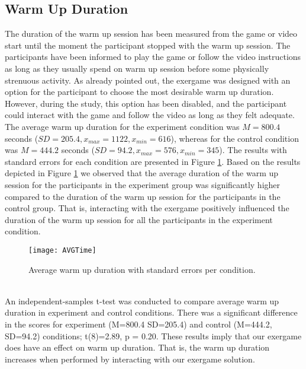 \subsection{Warm Up Duration}
The duration of the warm up session has been measured from the game or video start until the moment the participant stopped with the warm up session. The participants have been informed to play the game or follow the video instructions as long as they usually spend on warm up session before some physically strenuous activity. As already pointed out, the exergame was designed with an option for the participant to choose the most desirable warm up duration. However, during the study, this option has been disabled, and the participant could interact with the game and follow the video as long as they felt adequate. The average warm up duration for the experiment condition was \begin{math}M = 800.4 \end{math} seconds (\begin{math} SD = 205.4, x_{max}=1122, x_{min}=616 \end{math}), whereas for the control condition was \begin{math}M = 444.2 \end{math} seconds (\begin{math} SD = 94.2, x_{max}= 576, x_{min}= 345\end{math}). The  results with standard errors for each condition are presented in Figure \ref{fig:wuduration}. Based on the results depicted in Figure \ref{fig:wuduration} we observed that the average duration of the warm up session for the participants in the experiment group was significantly higher compared to the duration of the warm up session for the participants in the control group. That is, interacting with the exergame positively influenced the duration of the warm up session for all the participants in the experiment condition.
\begin{figure}[h]
    \centering
    \texttt{[image: AVGTime]}
    \caption{Average warm up duration with standard errors per condition.}
    \label{fig:wuduration}
\end{figure}\\
An independent-samples t-test was conducted to compare average warm up duration in experiment and control conditions. There was a significant difference in the scores for experiment (M=800.4 SD=205.4) and control (M=444.2, SD=94.2) conditions; t(8)=2.89, p = 0.20. These results imply that our exergame does have an effect on warm up duration. That is, the warm up duration increases when performed by interacting with our exergame solution. 
